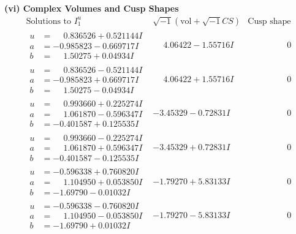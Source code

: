 \documentclass[1p]{elsarticle_modified}
\theoremstyle{definition}
\newcommand{\I}{\sqrt{-1}}
\begin{document}
\newpage\flushleft \textbf{(vi) Complex Volumes and Cusp Shapes}
$$\begin{array}{c|c|c}  
\text{Solutions to }I^u_{1}& \I (\text{vol} + \sqrt{-1}CS) & \text{Cusp shape}\\
 \hline 
\begin{aligned}
u &= \phantom{-}0.836526 + 0.521144 I \\
a &= -0.985823 - 0.669717 I \\
b &= \phantom{-}1.50275 + 0.04934 I\end{aligned}
 & \phantom{-}4.06422 - 1.55716 I & \phantom{-0.000000 } 0 \\ \hline\begin{aligned}
u &= \phantom{-}0.836526 - 0.521144 I \\
a &= -0.985823 + 0.669717 I \\
b &= \phantom{-}1.50275 - 0.04934 I\end{aligned}
 & \phantom{-}4.06422 + 1.55716 I & \phantom{-0.000000 } 0 \\ \hline\begin{aligned}
u &= \phantom{-}0.993660 + 0.225274 I \\
a &= \phantom{-}1.061870 - 0.596347 I \\
b &= -0.401587 + 0.125535 I\end{aligned}
 & -3.45329 - 0.72831 I & \phantom{-0.000000 } 0 \\ \hline\begin{aligned}
u &= \phantom{-}0.993660 - 0.225274 I \\
a &= \phantom{-}1.061870 + 0.596347 I \\
b &= -0.401587 - 0.125535 I\end{aligned}
 & -3.45329 + 0.72831 I & \phantom{-0.000000 } 0 \\ \hline\begin{aligned}
u &= -0.596338 + 0.760820 I \\
a &= \phantom{-}1.104950 + 0.053850 I \\
b &= -1.69790 - 0.01032 I\end{aligned}
 & -1.79270 + 5.83133 I & \phantom{-0.000000 } 0 \\ \hline\begin{aligned}
u &= -0.596338 - 0.760820 I \\
a &= \phantom{-}1.104950 - 0.053850 I \\
b &= -1.69790 + 0.01032 I\end{aligned}
 & -1.79270 - 5.83133 I & \phantom{-0.000000 } 0 \\ \hline\begin{aligned}

\end{aligned}
\end{array}$$
\end{document}
